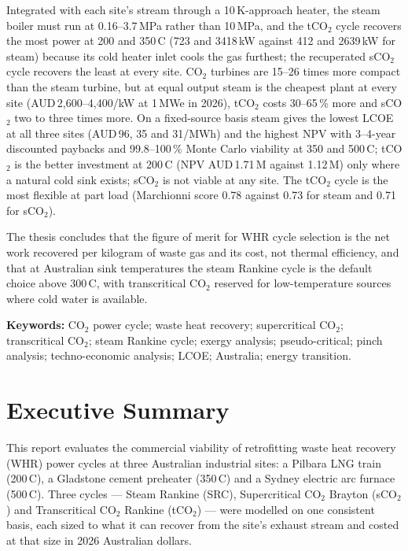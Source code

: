 Integrated with each site's stream through a 10\,K-approach heater, the
steam boiler must run at 0.16--3.7\,MPa rather than 10\,MPa, and the tCO$_2$
cycle recovers the most power at 200 and 350\,\textdegree C (723 and
3418\,kW against 412 and 2639\,kW for steam) because its cold heater inlet
cools the gas furthest; the recuperated sCO$_2$ cycle recovers the least at
every site. CO$_2$ turbines are 15--26 times more compact than the steam
turbine, but at equal output steam is the cheapest plant at every site
(AUD\,2{,}600--4{,}400/kW at 1\,MWe in 2026), tCO$_2$ costs 30--65\,\% more
and sCO$_2$ two to three times more. On a fixed-source basis steam gives the
lowest LCOE at all three sites (AUD\,96, 35 and 31/MWh) and the highest NPV
with 3--4-year discounted paybacks and 99.8--100\,\% Monte Carlo viability at
350 and 500\,\textdegree C; tCO$_2$ is the better investment at
200\,\textdegree C (NPV AUD\,1.71\,M against 1.12\,M) only where a natural
cold sink exists; sCO$_2$ is not viable at any site. The tCO$_2$ cycle is
the most flexible at part load (Marchionni score 0.78 against 0.73 for steam
and 0.71 for sCO$_2$).

The thesis concludes that the figure of merit for WHR cycle selection is the
net work recovered per kilogram of waste gas and its cost, not thermal
efficiency, and that at Australian sink temperatures the steam Rankine cycle
is the default choice above 300\,\textdegree C, with transcritical CO$_2$
reserved for low-temperature sources where cold water is available.

\bigskip\noindent\textbf{Keywords:} CO$_2$ power cycle; waste heat recovery;
supercritical CO$_2$; transcritical CO$_2$; steam Rankine cycle; exergy
analysis; pseudo-critical; pinch analysis; techno-economic analysis; LCOE;
Australia; energy transition.

\clearpage

\chapter*{Executive Summary}

This report evaluates the commercial viability of retrofitting waste heat
recovery (WHR) power cycles at three Australian industrial sites: a Pilbara
LNG train (200\,\textdegree C), a Gladstone cement preheater
(350\,\textdegree C) and a Sydney electric arc furnace (500\,\textdegree C).
Three cycles --- Steam Rankine (SRC), Supercritical CO$_2$ Brayton (sCO$_2$)
and Transcritical CO$_2$ Rankine (tCO$_2$) --- were modelled on one
consistent basis, each sized to what it can recover from the site's exhaust
stream and costed at that size in 2026 Australian dollars.

